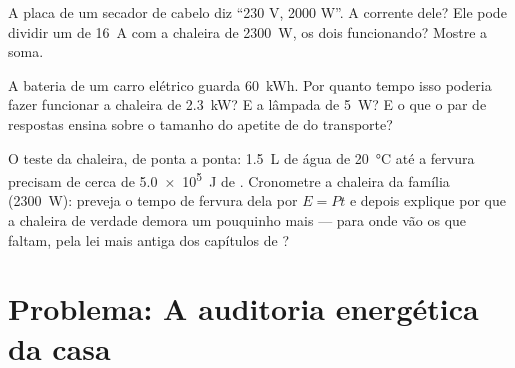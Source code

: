 \begin{exercise}[$\star\star$]\label{exo:g9:electric-power-energy:10}
A placa de um secador de cabelo diz ``230 V, 2000 W''. A corrente
dele? Ele pode dividir um  de \qty{16}{A} com a chaleira de
\qty{2300}{W}, os dois funcionando? Mostre a soma.
\end{exercise}

\begin{exercise}[$\star\star$]\label{exo:g9:electric-power-energy:11}
A bateria de um carro elétrico guarda \qty{60}{kWh}. Por quanto tempo
isso poderia fazer funcionar a chaleira de \qty{2.3}{kW}? E a lâmpada
de \qty{5}{W}? E o que o par de respostas ensina sobre o tamanho do
apetite de  do transporte?
\end{exercise}

\begin{exercise}[$\star\star\star$]\label{exo:g9:electric-power-energy:12}
O teste da chaleira, de ponta a ponta: \qty{1.5}{L} de água de
\qty{20}{\celsius} até a fervura precisam de cerca de \qty{5.0e5}{J}
de . Cronometre a chaleira da família (\qty{2300}{W}): preveja o
tempo de fervura dela por $E = P t$ e depois explique por que a
chaleira de verdade demora um pouquinho mais --- para onde vão os
 que faltam, pela lei mais antiga dos capítulos de ?
\end{exercise}

\section{Problema: A auditoria energética da casa}

